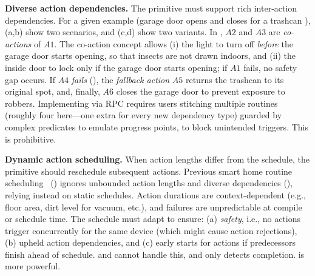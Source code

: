 \noindent \textbf{Diverse action dependencies.}
The primitive must support rich inter-action dependencies. For a given example (garage door opens and closes for a trashcan
), (a,b) show two scenarios, and (c,d) show two variants. 
In ,
$A2$ and $A3$ are \textit{co-actions} of
$A1$. The co-action concept allows (i) the light to turn off {\it before} the garage door starts opening, so that insects are not drawn indoors, and (ii) the inside door to lock only if the garage door starts opening; 
if $A1$ fails, no safety gap occurs.
If $A4$ \textit{fails}
(), the \textit{fallback action} $A5$ returns the trashcan
to its original spot, and, finally, $A6$ closes the garage door
to prevent exposure to robbers. 
Implementing  via RPC 
requires users stitching multiple routines 
(roughly four here---one extra for every new dependency type) guarded by complex predicates to emulate progress points, 
to block unintended triggers. This is prohibitive.  

\noindent \textbf{Dynamic action scheduling.}
When action lengths differ from the schedule, the primitive should reschedule subsequent actions. 
Previous smart home routine scheduling~\cite{SafeHomeEuroSys2021} 
() ignores 
unbounded action lengths and diverse dependencies (), relying instead on static schedules. 
Action durations are context-dependent (e.g., 
floor area, dirt level for vacuum, etc.), and failures are unpredictable at compile or schedule time. 
The schedule must adapt to ensure: (a) \textit{safety}, i.e.,
no actions trigger concurrently for the same device
(which might cause 
action rejections),  (b) upheld action dependencies, and (c) 
early starts for actions if predecessors finish ahead of schedule.
\RPCa{} and \RPCs{} cannot handle this, and \RPCc{} only detects completion. 
\abstraction{} is more powerful.